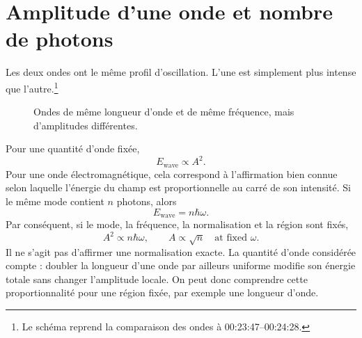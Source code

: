 \section{Amplitude d’une onde et nombre de photons}

\begin{classroomqa}
\end{classroomqa}

Les deux ondes ont le même profil d’oscillation. L’une est simplement plus intense que l’autre.\footnote{Le schéma reprend la comparaison des ondes à 00:23:47--00:24:28.}

\begin{figure}[t]
\centering
{}
\caption{Ondes de même longueur d’onde et de même fréquence, mais d’amplitudes différentes.}
\end{figure}

Pour une quantité d’onde fixée,
\begin{equation}
E_{\text{wave}}\propto A^2.
\end{equation}
Pour une onde électromagnétique, cela correspond à l’affirmation bien connue selon laquelle l’énergie du champ est proportionnelle au carré de son intensité. Si le même mode contient \(n\) photons, alors
\begin{equation}
E_{\text{wave}}=n\hbar\omega.
\end{equation}
Par conséquent, si le mode, la fréquence, la normalisation et la région sont fixés,
\begin{equation}
A^2\propto n\hbar\omega,
\qquad
A\propto\sqrt n\quad\text{at fixed }\omega.
\end{equation}
Il ne s’agit pas d’affirmer une normalisation exacte. La quantité d’onde considérée compte : doubler la longueur d’une onde par ailleurs uniforme modifie son énergie totale sans changer l’amplitude locale. On peut donc comprendre cette proportionnalité pour une région fixée, par exemple une longueur d’onde.

